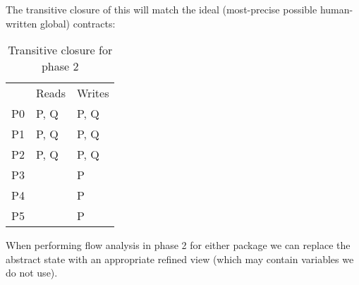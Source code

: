\documentclass{article}
\begin{document}
\noindent
The transitive closure of this will match the ideal (most-precise possible
human-written global) contracts:

\begin{table}[h]
  \begin{center}
    \begin{tabular}{lll}
         & Reads & Writes \\
      P0 & P, Q  & P, Q   \\
      P1 & P, Q  & P, Q   \\
      P2 & P, Q  & P, Q   \\
      P3 &       & P      \\
      P4 &       & P      \\
      P5 &       & P      \\
    \end{tabular}
  \end{center}
  \caption{Transitive closure for phase 2}
\end{table}

\noindent
When performing flow analysis in phase 2 for either package we can replace
the abstract state with an appropriate refined view (which may contain
variables we do not use).
\end{document}
